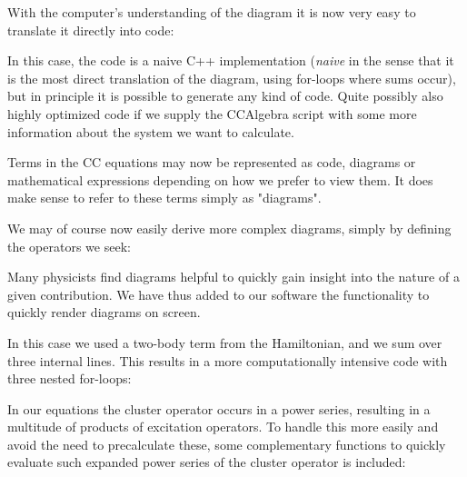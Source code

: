 With the computer's understanding of the diagram it is now very easy to translate it directly into code:

\begin{minipage}{\linewidth}
\end{minipage}

In this case, the code is a naive C++ implementation (\emph{naive} in
the sense that it is the most direct translation of the diagram, using
for-loops where sums occur), but in principle it is possible to
generate any kind of code. Quite possibly also highly optimized code
if we supply the CCAlgebra script with some more information about the
system we want to calculate.

Terms in the CC equations may now be represented as code, diagrams or
mathematical expressions depending on how we prefer to view them. It does make sense to
refer to these terms simply as "diagrams".

We may of course now easily derive more complex diagrams, simply by defining the operators we seek:

\begin{minipage}{\linewidth}
\end{minipage}

Many physicists find diagrams helpful to quickly gain insight into the
nature of a given contribution. We have thus  added to our software 
the functionality to quickly render diagrams on screen.

\begin{minipage}{\linewidth}
\end{minipage}

In this case we used a two-body term from the Hamiltonian, and we sum
over three internal lines. This results in a more computationally
intensive code with three nested for-loops:

\begin{minipage}{\linewidth}
\end{minipage}

In our equations the cluster operator occurs in a power series,
resulting in a multitude of products of excitation operators. To
handle this more easily and avoid the need to precalculate these, some
complementary functions to quickly evaluate such expanded power series
of the cluster operator is included:

